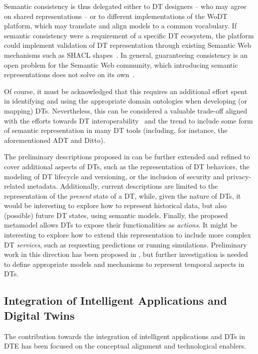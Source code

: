 Semantic consistency is thus delegated either to \ac{DT} designers -- who may agree on shared representations -- or to different implementations of the \ac{WoDT} platform, which may translate and align models to a common vocabulary.
%
If semantic consistency were a requirement of a specific \ac{DT} ecosystem, the platform could implement validation of \ac{DT} representation through existing Semantic Web mechanisms such as SHACL shapes~\cite{DBLP:conf/rweb/Pareti021}.
%
In general, guaranteeing consistency is an open problem for the Semantic Web community, which introducing semantic representations does not solve on its own~\cite{guizzardi2022ao}.

Of course, it must be acknowledged that this requires an additional effort spent in identifying and using the appropriate domain ontologies when developing (or mapping) \acp{DT}.
Nevertheless, this can be considered a valuable trade-off aligned with the efforts towards \ac{DT} interoperability~\cite{Klar_Arvidsson_Angelakis_2024} and the trend to include some form of semantic representation in many \ac{DT} tools (including, for instance, the aforementioned \acl{ADT} and Ditto).

The preliminary descriptions proposed in  can be further extended and refined to cover additional aspects of \acp{DT}, such as the representation of \ac{DT} behaviors, the modeling of \ac{DT} lifecycle and versioning, or the inclusion of security and privacy-related metadata.
%
Additionally, current descriptions are limited to the representation of the \emph{present} state of a \ac{DT}, while, given the nature of \acp{DT}, it would be interesting to explore how to represent historical data, but also (possible) future \ac{DT} states, using semantic models.
%
Finally, the proposed metamodel allows \acp{DT} to expose their functionalities as \emph{actions}.
%
It might be interesting to explore how to extend this representation to include more complex \ac{DT} \emph{services}, such as requesting predictions or running simulations. 
%
Preliminary work in this direction has been proposed in \cite{DBLP:conf/models/BurattiniZPR24}, but further investigation is needed to define appropriate models and mechanisms to represent temporal aspects in \acp{DT}.

\subsection*{Integration of Intelligent Applications and Digital Twins}
The contribution towards the integration of intelligent applications and \acp{DT} in \ac{DTE} has been focused on the conceptual alignment and technological enablers. 

